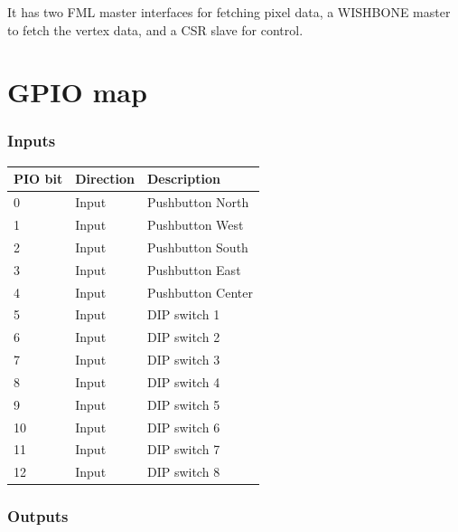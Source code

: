 \documentclass[a4paper,11pt]{article}
\begin{document}
It has two FML master interfaces for fetching pixel data, a WISHBONE master to fetch the vertex data, and a CSR slave for control.

\section{GPIO map}

\subsubsection{Inputs}

\begin{tabularx}{\textwidth}{|l|l|X|}
\hline
\bf{PIO bit} & \bf{Direction} & \bf{Description} \\
\hline
0 & Input & Pushbutton North \\
\hline
1 & Input & Pushbutton West \\
\hline
2 & Input & Pushbutton South \\
\hline
3 & Input & Pushbutton East \\
\hline
4 & Input & Pushbutton Center \\
\hline
5 & Input & DIP switch 1 \\
\hline
6 & Input & DIP switch 2 \\
\hline
7 & Input & DIP switch 3 \\
\hline
8 & Input & DIP switch 4 \\
\hline
9 & Input & DIP switch 5 \\
\hline
10 & Input & DIP switch 6 \\
\hline
11 & Input & DIP switch 7 \\
\hline
12 & Input & DIP switch 8 \\
\hline
\end{tabularx}

\subsubsection{Outputs}
\end{document}
